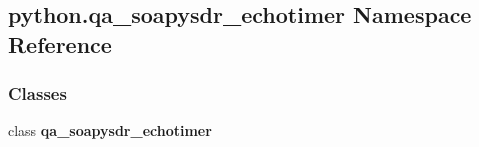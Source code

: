 \subsection{python.\+qa\+\_\+soapysdr\+\_\+echotimer Namespace Reference}
\label{namespacepython_1_1qa__soapysdr__echotimer}
\subsubsection*{Classes}
\begin{DoxyCompactItemize}
\item 
class {\bf qa\+\_\+soapysdr\+\_\+echotimer}
\end{DoxyCompactItemize}
